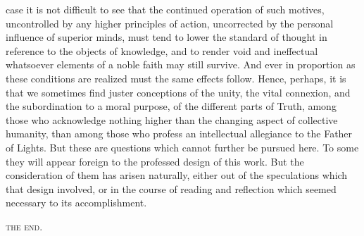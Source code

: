\documentclass[oneside]{book}
\begin{document}
case it is not difficult to see that the continued operation of
such motives, uncontrolled by any higher principles of action,
uncorrected by the personal influence of superior minds, must
tend to lower the standard of thought in reference to the objects
of knowledge, and to render void and ineffectual whatsoever elements
of a noble faith may still survive. And ever in proportion
as these conditions are realized must the same effects follow.
Hence, perhaps, it is that we sometimes find juster conceptions
of the unity, the vital connexion, and the subordination to a
moral purpose, of the different parts of Truth, among those who
acknowledge nothing higher than the changing aspect of collective
humanity, than among those who profess an intellectual
allegiance to the Father of Lights. But these are questions
which cannot further be pursued here. To some they will appear
foreign to the professed design of this work. But the
consideration of them has arisen naturally, either out of the
speculations which that design involved, or in the course of
reading and reflection which seemed necessary to its accomplishment.

\centerline{\textsc{the end.}}
\end{document}
